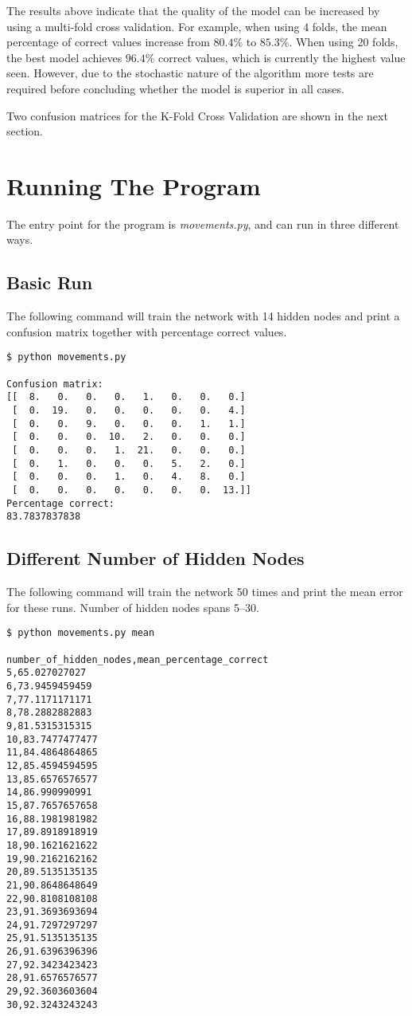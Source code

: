 \documentclass{article}
\begin{document}
\noindent The results above indicate that the quality of the model can be increased by using a multi-fold cross validation. For example, when using 4 folds, the mean percentage of correct values increase from $80.4\%$ to $85.3\%$. When using 20 folds, the best model achieves $96.4\%$ correct values, which is currently the highest value seen. However, due to the stochastic nature of the algorithm more tests are required before concluding whether the model is superior in all cases.

Two confusion matrices for the K-Fold Cross Validation are shown in the next section.

\section*{Running The Program}

The entry point for the program is \textit{movements.py}, and can run in three different ways.

\subsection*{Basic Run}

The following command will train the network with 14 hidden nodes and print a confusion matrix together with percentage correct values.

\begin{verbatim}
$ python movements.py

Confusion matrix:
[[  8.   0.   0.   0.   1.   0.   0.   0.]
 [  0.  19.   0.   0.   0.   0.   0.   4.]
 [  0.   0.   9.   0.   0.   0.   1.   1.]
 [  0.   0.   0.  10.   2.   0.   0.   0.]
 [  0.   0.   0.   1.  21.   0.   0.   0.]
 [  0.   1.   0.   0.   0.   5.   2.   0.]
 [  0.   0.   0.   1.   0.   4.   8.   0.]
 [  0.   0.   0.   0.   0.   0.   0.  13.]]
Percentage correct:
83.7837837838
\end{verbatim}

\subsection*{Different Number of Hidden Nodes}

The following command will train the network 50 times and print the mean error for these runs. Number of hidden nodes spans 5--30.

\begin{verbatim}
$ python movements.py mean

number_of_hidden_nodes,mean_percentage_correct
5,65.027027027
6,73.9459459459
7,77.1171171171
8,78.2882882883
9,81.5315315315
10,83.7477477477
11,84.4864864865
12,85.4594594595
13,85.6576576577
14,86.990990991
15,87.7657657658
16,88.1981981982
17,89.8918918919
18,90.1621621622
19,90.2162162162
20,89.5135135135
21,90.8648648649
22,90.8108108108
23,91.3693693694
24,91.7297297297
25,91.5135135135
26,91.6396396396
27,92.3423423423
28,91.6576576577
29,92.3603603604
30,92.3243243243
\end{verbatim}
\end{document}
